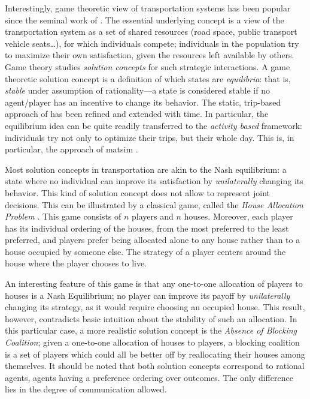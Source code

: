 {Interestingly, game theoretic view of transportation systems has been popular since the seminal work of \citet{Wardrop_PICE_1952}. The essential underlying concept is a view of the transportation system as a set of shared resources (road space, public transport vehicle seats\ldots), for which individuals compete; individuals in the population try to maximize their own satisfaction, given the resources left available by others. Game theory studies \emph{solution concepts} for such strategic interactions. A game theoretic solution concept is a definition of which states are \emph{equilibria}: that is, \emph{stable} under assumption of rationality---a state is considered stable if no agent/player has an incentive to change its behavior. The static, trip-based approach of \citet{Wardrop_PICE_1952} has been refined and extended with time. In particular, the equilibrium idea can be quite readily transferred to the \emph{activity based} framework: individuals try not only to optimize their trips, but their whole day. This is, in particular, the approach of \gls{matsim} \citep{Axhausen_SSRL_2006, NagelFloetteroed2009IatbrResourceInBook}.

Most solution concepts in transportation are akin to the Nash equilibrium: a state where no individual can improve its satisfaction by \emph{unilaterally} changing its behavior. This kind of solution concept does not allow to represent joint decisions. This can be illustrated by a classical game, called the \emph{House Allocation Problem} \citep{SchummerVohra_NisanEtAl_2007}. This game consists of $n$ players and $n$ houses. Moreover, each player has its individual ordering of the houses, from the most preferred to the least preferred, and players prefer being allocated alone to any house rather than to a house occupied by someone else. The strategy of a player centers around the house where the player chooses to live.

An interesting feature of this game is that any one-to-one allocation of players to houses is a Nash Equilibrium; no player can improve its payoff by \emph{unilaterally} changing its strategy, as it would require choosing an occupied house. This result, however, contradicts basic intuition about the stability of such an allocation. In this particular case, a more realistic solution concept is the \emph{Absence of Blocking Coalition}; given a one-to-one allocation of houses to players, a blocking coalition is a set of players which could all be better off by reallocating their houses among themselves. It should be noted that both solution concepts correspond to rational agents, \ie agents having a preference ordering over outcomes. The only difference lies in the degree of communication allowed.

}
